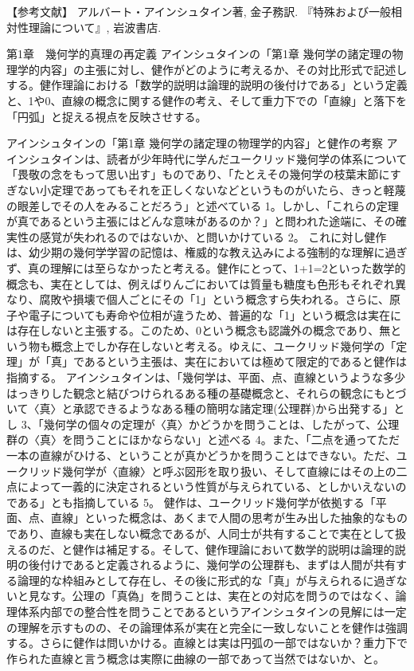\documentclass{article}
\begin{document}
【参考文献】
アルバート・アインシュタイン著, 金子務訳. 『特殊および一般相対性理論について』, 岩波書店.


第1章　幾何学的真理の再定義
アインシュタインの「第1章 幾何学の諸定理の物理学的内容」の主張に対し、健作がどのように考えるか、その対比形式で記述しする。健作理論における「数学的説明は論理的説明の後付けである」という定義と、1や0、直線の概念に関する健作の考え、そして重力下での「直線」と落下を「円弧」と捉える視点を反映させする。

アインシュタインの「第1章 幾何学の諸定理の物理学的内容」と健作の考察
アインシュタインは、読者が少年時代に学んだユークリッド幾何学の体系について「畏敬の念をもって思い出す」ものであり、「たとえその幾何学の枝葉末節にすぎない小定理であってもそれを正しくないなどというものがいたら、きっと軽蔑の眼差しでその人をみることだろう」と述べている 1。しかし、「これらの定理が真であるという主張にはどんな意味があるのか？」と問われた途端に、その確実性の感覚が失われるのではないか、と問いかけている 2。
これに対し健作は、幼少期の幾何学学習の記憶は、権威的な教え込みによる強制的な理解に過ぎず、真の理解には至らなかったと考える。健作にとって、1+1=2といった数学的概念も、実在としては、例えばりんごにおいては質量も糖度も色形もそれぞれ異なり、腐敗や損壊で個人ごとにその「1」という概念すら失われる。さらに、原子や電子についても寿命や位相が違うため、普遍的な「1」という概念は実在には存在しないと主張する。このため、0という概念も認識外の概念であり、無という物も概念上でしか存在しないと考える。ゆえに、ユークリッド幾何学の「定理」が「真」であるという主張は、実在においては極めて限定的であると健作は指摘する。
アインシュタインは、「幾何学は、平面、点、直線というような多少はっきりした観念と結びつけられるある種の基礎概念と、それらの観念にもとづいて〈真〉と承認できるようなある種の簡明な諸定理(公理群)から出発する」とし 3、「幾何学の個々の定理が〈真〉かどうかを問うことは、したがって、公理群の〈真〉を問うことにほかならない」と述べる 4。また、「二点を通ってただ一本の直線がひける、ということが真かどうかを問うことはできない。ただ、ユークリッド幾何学が〈直線〉と呼ぶ図形を取り扱い、そして直線にはその上の二点によって一義的に決定されるという性質が与えられている、としかいえないのである」とも指摘している 5。
健作は、ユークリッド幾何学が依拠する「平面、点、直線」といった概念は、あくまで人間の思考が生み出した抽象的なものであり、直線も実在しない概念であるが、人同士が共有することで実在として扱えるのだ、と健作は補足する。そして、健作理論において数学的説明は論理的説明の後付けであると定義されるように、幾何学の公理群も、まずは人間が共有する論理的な枠組みとして存在し、その後に形式的な「真」が与えられるに過ぎないと見なす。公理の「真偽」を問うことは、実在との対応を問うのではなく、論理体系内部での整合性を問うことであるというアインシュタインの見解には一定の理解を示すものの、その論理体系が実在と完全に一致しないことを健作は強調する。さらに健作は問いかける。直線とは実は円弧の一部ではないか？重力下で作られた直線と言う概念は実際に曲線の一部であって当然ではないか、と。
\end{document}
